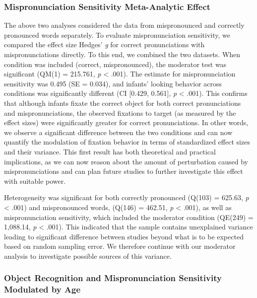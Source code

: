 \documentclass[man]{apa6}
\theoremstyle{definition}
\theoremstyle{definition}
\theoremstyle{definition}
\theoremstyle{remark}
\begin{document}
\subsubsection{Mispronunciation Sensitivity Meta-Analytic
Effect}\label{mispronunciation-sensitivity-meta-analytic-effect}

The above two analyses considered the data from mispronounced and
correctly pronounced words separately. To evaluate mispronunciation
sensitivity, we compared the effect size Hedges' \emph{g} for correct
pronunciations with mispronunciations directly. To this end, we combined
the two datasets. When condition was included (correct, mispronounced),
the moderator test was significant (QM(1) = 215.761, \emph{p}
\textless{} .001). The estimate for mispronunciation sensitivity was
0.495 (SE = 0.034), and infants' looking behavior across conditions was
significantly different (CI {[}0.429, 0.561{]}, \emph{p} \textless{}
.001). This confirms that although infants fixate the correct object for
both correct pronunciations and mispronunciations, the observed
fixations to target (as measured by the effect sizes) were significantly
greater for correct pronunciations. In other words, we observe a
significant difference between the two conditions and can now quantify
the modulation of fixation behavior in terms of standardized effect
sizes and their variance. This first result has both theoretical and
practical implications, as we can now reason about the amount of
perturbation caused by mispronunciations and can plan future studies to
further investigate this effect with suitable power.

Heterogeneity was significant for both correctly pronounced (Q(103) =
625.63, \emph{p} \textless{} .001) and mispronounced words, (Q(146) =
462.51, \emph{p} \textless{} .001), as well as mispronunciation
sensitivity, which included the moderator condition (QE(249) = 1,088.14,
\emph{p} \textless{} .001). This indicated that the sample contains
unexplained variance leading to significant difference between studies
beyond what is to be expected based on random sampling error. We
therefore continue with our moderator analysis to investigate possible
sources of this variance.

\subsubsection{Object Recognition and Mispronunciation Sensitivity
Modulated by
Age}\label{object-recognition-and-mispronunciation-sensitivity-modulated-by-age}
\end{document}
